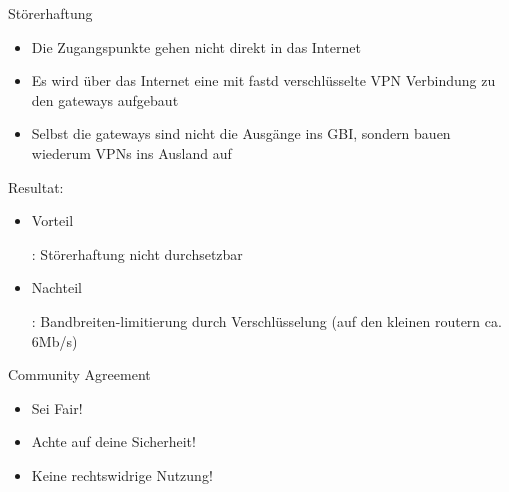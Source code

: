 \documentclass[c]{beamer}
\begin{document}
\begin{frame}{Störerhaftung}
	\begin{itemize}
		\item Die Zugangspunkte gehen nicht direkt in das Internet
		\item Es wird über das Internet eine mit fastd verschlüsselte VPN Verbindung zu den gateways aufgebaut
		\item Selbst die gateways sind nicht die Ausgänge ins GBI, sondern bauen wiederum VPNs ins Ausland auf
	\end{itemize}
	Resultat:
	\begin{itemize}
		\item \begin{it}Vorteil\end{it}: Störerhaftung nicht durchsetzbar
		\item \begin{it}Nachteil\end{it}: Bandbreiten-limitierung durch Verschlüsselung (auf den kleinen routern ca. 6Mb/s)
	\end{itemize}
\end{frame}


\begin{frame}{Community Agreement}
	\begin{itemize}
		\item Sei Fair!
		\item Achte auf deine Sicherheit!
		\item Keine rechtswidrige Nutzung!
	\end{itemize}
\end{frame}
\end{document}
